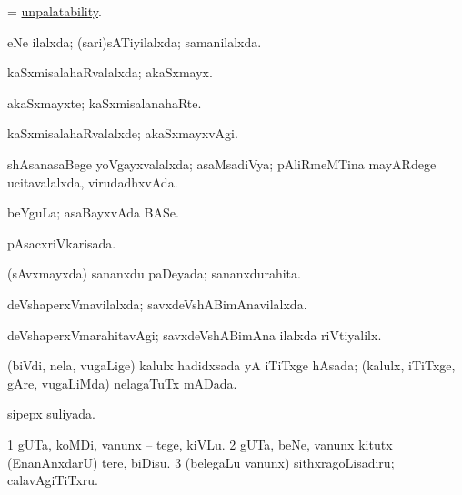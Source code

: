 \bentry
{} 
\gl{\nA}
\expl{}
\bmng
= \hyperlink{unpalatability}{unpalatability}. 
\emng
\eentry

\bentry
{} 
\gl{\gu}
\expl{}
\bmng
eNe ilalxda; (sari)sATiyilalxda; samanilalxda. 
\emng
\eentry

\bentry
{} 
\gl{\gu}
\expl{}
\bmng
kaSxmisalahaRvalalxda; akaSxmayx. 
\emng
\eentry

\bentry
{} 
\gl{\nA}
\expl{}
\bmng
akaSxmayxte; kaSxmisalanahaRte. 
\emng
\eentry

\bentry
{} 
\gl{\kirxvi}
\expl{}
\bmng
kaSxmisalahaRvalalxde; akaSxmayxvAgi. 
\emng
\eentry

\bentry
{} 
\gl{\gu}
\expl{}
\bmng
shAsanasaBege yoVgayxvalalxda; asaMsadiVya; pAliRmeMTina mayARdege ucitavalalxda, virudadhxvAda. 
\emng

\noindent 
\gl{\pagu}
\expl{}
\bmng
{} beYguLa; asaBayxvAda BASe. 
\emng
\eentry

\bentry
{} 
\gl{\gu}
\expl{}
\bmng
pAsacxriVkarisada. 
\emng
\eentry

\bentry
{} 
\gl{\gu}
\expl{}
\bmng
(sAvxmayxda) sananxdu paDeyada; sananxdurahita. 
\emng
\eentry

\bentry
{} 
\gl{\gu}
\expl{}
\bmng
deVshaperxVmavilalxda; savxdeVshABimAnavilalxda. 
\emng
\eentry

\bentry
{} 
\gl{\kirxvi}
\expl{}
\bmng
deVshaperxVmarahitavAgi; savxdeVshABimAna ilalxda riVtiyalilx. 
\emng
\eentry

\bentry
{} 
\gl{\gu}
\bmng
(biVdi, nela, \mo vugaLige) kalulx hadidxsada yA iTiTxge hAsada; (kalulx, iTiTxge, gAre, \mo vugaLiMda) nelagaTuTx mADada. 
\emng
\eentry

\bentry
{} 
\gl{\gu}
\bmng
sipepx suliyada. 
\emng
\eentry

\bentry
{} 
\gl{\sakirx}
\bmng
\bnum
\num{1} gUTa, koMDi, \mo vanunx -- tege, kiVLu. 
\num{2} gUTa, beNe, \mo vanunx kitutx (EnanAnxdarU) tere, biDisu. 
\num{3} (belegaLu \mo vanunx) sithxragoLisadiru; calavAgiTiTxru. 
\enum
\emng
\eentry

